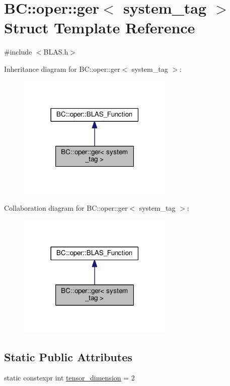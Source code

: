 \hypertarget{structBC_1_1oper_1_1ger}{}\section{BC\+:\+:oper\+:\+:ger$<$ system\+\_\+tag $>$ Struct Template Reference}
\label{structBC_1_1oper_1_1ger}


{\ttfamily \#include $<$B\+L\+A\+S.\+h$>$}



Inheritance diagram for BC\+:\+:oper\+:\+:ger$<$ system\+\_\+tag $>$\+:
\nopagebreak
\begin{figure}[H]
\begin{center}
\leavevmode
\includegraphics[width=210pt]{structBC_1_1oper_1_1ger__inherit__graph}
\end{center}
\end{figure}


Collaboration diagram for BC\+:\+:oper\+:\+:ger$<$ system\+\_\+tag $>$\+:
\nopagebreak
\begin{figure}[H]
\begin{center}
\leavevmode
\includegraphics[width=210pt]{structBC_1_1oper_1_1ger__coll__graph}
\end{center}
\end{figure}
\subsection*{Static Public Attributes}
\begin{DoxyCompactItemize}
\item 
static constexpr int \hyperlink{structBC_1_1oper_1_1ger_aea73977f252736f0d2b20fe3ae5361bb}{tensor\+\_\+dimension} = 2
\end{DoxyCompactItemize}



